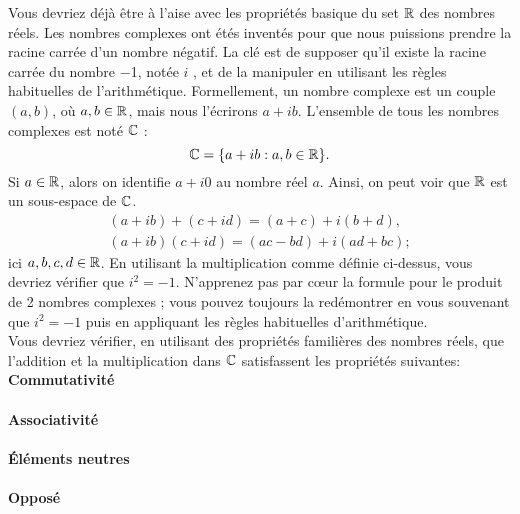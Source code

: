 \documentclass[12pt]{book}
\theoremstyle{plain}
\begin{document}
Vous devriez déjà être à l'aise avec les propriétés basique du set $\mathbb{R}$  des nombres réels. Les nombres complexes ont étés inventés pour que nous puissions prendre la racine carrée d'un nombre négatif. La clé est de supposer qu'il existe la racine carrée du nombre $-$1, notée $i$
, et de la manipuler en utilisant les règles habituelles de l'arithmétique. Formellement, un nombre complexe est un couple $(a,b)$, o\`u $a, b \in \mathbb{R}$, mais nous l'écrirons $a + ib$. L'ensemble de tous les nombres complexes est noté $\mathbb{C}$ :
\begin{equation*}
    \mathbb{C} = \{a + ib : a,b \in \mathbb{R}\}.
\end{equation*}
Si $a \in \mathbb{R}$, alors on identifie $a + i0$ au nombre réel $a$. Ainsi, on peut voir que $\mathbb{R}$ est un sous-espace de $\mathbb{C}$.\\
\begin{eqnarray*}
    (a+ib)+(c+id)=(a+c)+i(b+d),\\
    (a+ib)(c+id)=(ac-bd)+i(ad+bc);
\end{eqnarray*}
ici $a,b,c,d \in \mathbb{R}$. En utilisant la multiplication comme définie ci-dessus, vous devriez vérifier que $i^2=-1$. N'apprenez pas par cœur la formule pour le produit de 2 nombres complexes ; vous pouvez toujours la redémontrer en vous souvenant que $i^2=-1$ puis en appliquant les règles habituelles d'arithmétique.\\
\indent{}Vous devriez vérifier, en utilisant des propriétés familières des nombres réels, que l'addition et la multiplication dans $\mathbb{C}$ satisfassent les propriétés suivantes:\\

\noindent
\textbf{Commutativité}\\
\\

\noindent
\textbf{Associativité}\\
\\

\noindent
\textbf{Éléments neutres}\\
\\

\noindent
\textbf{Opposé}\\
\\
\end{document}
